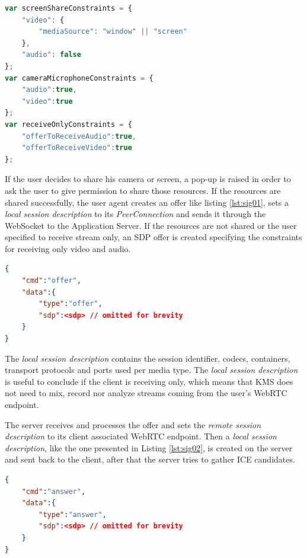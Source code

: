 \begin{minipage}{\linewidth}
\begin{lstlisting}[caption={Media constraints},label={lst:constraints},language=JavaScript]
var screenShareConstraints = {	
	"video": {
		"mediaSource": "window" || "screen"
	}, 
	"audio": false
};
var cameraMicrophoneConstraints = {
	"audio":true, 
	"video":true 
};
var receiveOnlyConstraints = {
	"offerToReceiveAudio":true,
	"offerToReceiveVideo":true
};
\end{lstlisting}
\end{minipage}

If the user decides to share his camera or screen, a pop-up is raised in order to ask the user to give permission to share those resources. If the resources are shared successfully, the user agent creates an offer like listing \ref{lst:sig01}, sets a \emph{local session description} to its \emph{PeerConnection} and sends it through the WebSocket to the Application Server.
If the resources are not shared or the user specified to receive stream only, an \ac{SDP} offer is created specifying the constraints for receiving only video and audio.

\begin{minipage}{\linewidth}
\begin{lstlisting}[caption={Offer created by client},label={lst:sig01},language=json]
{
	"cmd":"offer",
	"data":{
		"type":"offer",
		"sdp":<sdp>	// omitted for brevity
	}
}
\end{lstlisting}
\end{minipage}

The \emph{local session description} contains the session identifier, codecs, containers, transport protocols and ports used per media type. The \emph{local session description} is useful to conclude if the client is receiving only, which means that \ac{KMS} does not need to mix, record nor analyze streams coming from the user's \ac{WebRTC} endpoint. 

The server receives and processes the offer and sets the \emph{remote session description} to its client associated \ac{WebRTC} endpoint. Then a \emph{local session description}, like the one presented in Listing \ref{lst:sig02}, is created on the server and sent back to the client, after that the server tries to gather \ac{ICE} candidates.

\begin{minipage}{\linewidth}
\begin{lstlisting}[caption={Answer created by KMS},label={lst:sig02},language=json]
{
	"cmd":"answer",
	"data":{
		"type":"answer",
		"sdp":<sdp>	// omitted for brevity
	}
}
\end{lstlisting}
\end{minipage}

